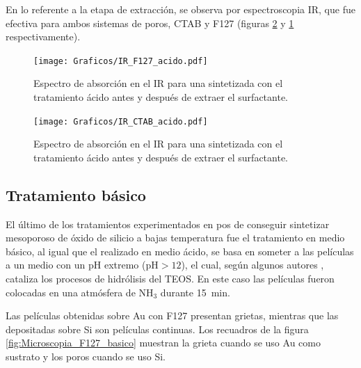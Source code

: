 {		En lo referente a la etapa de extracción, se observa por espectroscopia IR, que fue efectiva para ambos sistemas de poros, CTAB y F127 (figuras \ref{fig:IR_CTAB_acido} y \ref{fig:IR_F127_acido} respectivamente).	
			
		\begin{figure}[!ht]
			\begin{center}
			\texttt{[image: Graficos/IR\_F127\_acido.pdf]}
			\caption[FTIR \pdmF\space tratamiento ácido.]{Espectro de absorción en el IR para una \pdmF\space sintetizada con el tratamiento ácido antes y después de extraer el surfactante.}
			\label{fig:IR_F127_acido}
			\end{center}
			\end{figure}
		
		\pagebreak

		 \begin{figure}[!ht]
			\begin{center}
			\texttt{[image: Graficos/IR\_CTAB\_acido.pdf]}
			\caption[FTIR \pdmC\space tratamiento ácido.]{Espectro de absorción en el IR para una \pdmC\space sintetizada con el tratamiento ácido antes y después de extraer el surfactante.}
			\label{fig:IR_CTAB_acido}
			\end{center}
			\end{figure}
 	
	\subsection{Tratamiento básico}

		El último de los tratamientos experimentados en pos de conseguir sintetizar mesoporoso de óxido de silicio a bajas temperatura fue el tratamiento en medio básico, al igual que el realizado en medio ácido, se basa en someter a las películas a un medio con un pH extremo (pH$>12$), el cual, según algunos autores \cite{Soler-Illia2011,Huo1996,Ichinose2002}, cataliza los procesos de hidrólisis del TEOS. En este caso las películas fueron colocadas en una atmósfera de NH$_3$ durante \SI{15}{\minute}. 

		Las películas obtenidas sobre Au con F127 presentan grietas, mientras que las depositadas sobre Si son películas continuas. Los recuadros de la figura \ref{fig:Microscopia_F127_basico} muestran la grieta cuando se uso Au como sustrato y los poros cuando se uso Si.

}
